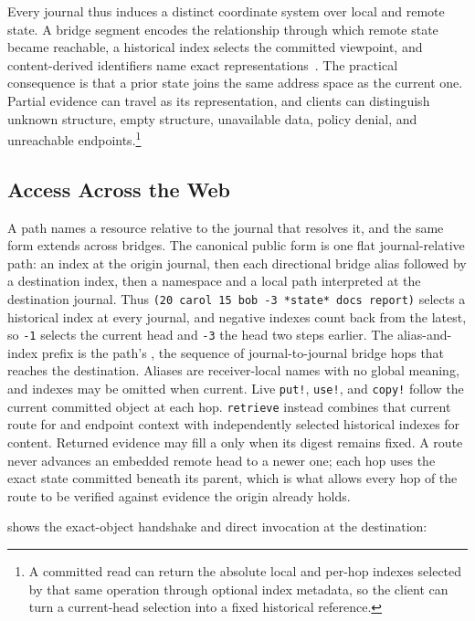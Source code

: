 Every journal thus induces a distinct coordinate system over local and remote state. A bridge segment encodes the relationship through which remote state became reachable, a historical index selects the committed viewpoint, and content-derived identifiers name exact representations~\cite{Haber1997secure,Kuhn2014trusty,Zhang2014named}. The practical consequence is that a prior state joins the same address space as the current one. Partial evidence can travel as its representation, and clients can distinguish unknown structure, empty structure, unavailable data, policy denial, and unreachable endpoints.\footnote{A committed read can return the absolute local and per-hop indexes selected by that same operation through optional index metadata, so the client can turn a current-head selection into a fixed historical reference.}

\subsection{Access Across the Web}
\label{sec:access-paths}

A path names a resource relative to the journal that resolves it, and the same form extends across bridges. The canonical public form is one flat journal-relative path: an index at the origin journal, then each directional bridge alias followed by a destination index, then a namespace and a local path interpreted at the destination journal. Thus \texttt{(20 carol 15 bob -3 *state* docs report)} selects a historical index at every journal, and negative indexes count back from the latest, so \texttt{-1} selects the current head and \texttt{-3} the head two steps earlier. The alias-and-index prefix is the path's , the sequence of journal-to-journal bridge hops that reaches the destination. Aliases are receiver-local names with no global meaning, and indexes may be omitted when current. Live \texttt{put!}, \texttt{use!}, and \texttt{copy!} follow the current committed object at each hop. \texttt{retrieve} instead combines that current route for  and endpoint context with independently selected historical indexes for content. Returned evidence may fill a  only when its digest remains fixed. A route never advances an embedded remote head to a newer one; each hop uses the exact state committed beneath its parent, which is what allows every hop of the route to be verified against evidence the origin already holds.

 shows the exact-object handshake and direct invocation at the destination:

